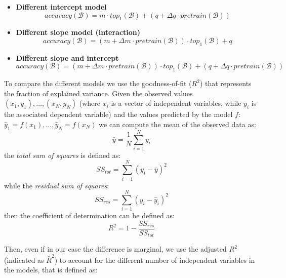 \documentclass{article}
\begin{document}
\begin{itemize}
    \item \textbf{Different intercept model}
    \begin{equation}
        accuracy(\mathcal{B}) = m \cdot top_1(\mathcal{B}) + (q + \Delta q \cdot pretrain(\mathcal{B}))
    \end{equation}
    
    \item \textbf{Different slope model (interaction)}
    \begin{equation}
         accuracy(\mathcal{B}) = (m + \Delta m \cdot pretrain(\mathcal{B})) \cdot top_1(\mathcal{B}) + q
    \end{equation}
    
    \item \textbf{Different slope and intercept} 
    \begin{equation}
         accuracy(\mathcal{B}) = (m + \Delta m \cdot pretrain(\mathcal{B})) \cdot top_1(\mathcal{B}) + (q + \Delta q \cdot pretrain(\mathcal{B}))
    \end{equation}
\end{itemize}

To compare the different models we use the goodness-of-fit ($R^2$) that represents the fraction of explained variance. Given the observed values $(x_1, y_1), \ldots, (x_N, y_N)$ (where $x_i$ is a vector of independent variables, while $y_i$ is the associated dependent variable) and the values predicted by the model $f$: $\hat{y}_1 = f(x_1), \ldots, \hat{y}_N = f(x_N)$ we can compute the mean of the observed data as:
\begin{equation}
    \bar{y} = \frac{1}{N}\sum_{i=1}^N y_i
\end{equation}
the \textit{total sum of squares} is defined as:
\begin{equation}
    SS_{tot} = \sum_{i=1}^N (y_i - \bar{y})^2
\end{equation}
while the \textit{residual sum of squares}:
\begin{equation}
    SS_{res} = \sum_{i=1}^N (y_i - \hat{y}_i)^2
\end{equation}
then the coefficient of determination can be defined as:
\begin{equation}
    R^2 = 1 - \frac{SS_{res}}{SS_{tot}}
\end{equation}

Then, even if in our case the difference is marginal, we use the adjusted $R^2$ (indicated as $\bar{R}^2$) to account for the different number of independent variables in the models, that is defined as:
\end{document}
